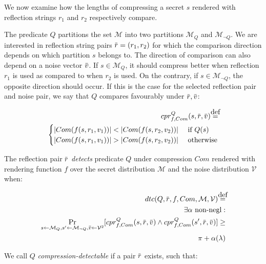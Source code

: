 \documentclass{sig-alternate-05-2015}
\newcommand\defeq{\stackrel{\mathclap{\normalfont\mbox{def}}}{=}}
\newcommand{\overbar}[1]{\mkern 1.5mu\overline{\mkern-1.5mu#1\mkern-1.5mu}\mkern 1.5mu}
\begin{document}
We now examine how the lengths of compressing a secret $s$ rendered with
reflection strings $r_1$ and $r_2$ respectively compare.

The predicate $Q$ partitions the set $\mathcal{M}$ into two partitions
$\mathcal{M}_Q$ and $\mathcal{M}_{\lnot Q}$. We are interested in reflection
string pairs $\overbar{r} = (r_1, r_2)$ for which the comparison direction
depends on which partition $s$ belongs to.  The direction of comparison can
also depend on a noise vector $\overbar{v}$.  If $s \in \mathcal{M}_Q$, it
should compress better when reflection $r_1$ is used as compared to when $r_2$
is used. On the contrary, if $s \in \mathcal{M}_{\lnot Q}$, the opposite
direction should occur.  If this is the case for the selected reflection pair
and noise pair, we say that $Q$ compares favourably under $\overbar{r},
\overbar{v}$:

\begin{equation*}
\begin{split}
    cpr^Q_{f, Com}(s, \overbar{r}, \overbar{v})
    \defeq\\
    \begin{cases}
        |Com(f(s, r_1, v_1))| < |Com(f(s, r_2, v_2))| &\text{ if } Q(s)\\
        |Com(f(s, r_1, v_1))| > |Com(f(s, r_2, v_2))| &\text{ otherwise}
    \end{cases}
\end{split}
\end{equation*}

The reflection pair $\overbar{r}$ \textit{detects} predicate $Q$ under
compression $Com$ rendered with rendering function $f$ over the secret
distribution $\mathcal{M}$ and the noise distribution $\mathcal{V}$ when:

\begin{align*}
    dtc(Q, \overbar{r}, f, Com, \mathcal{M}, \mathcal{V})
    \defeq\\
    \exists \alpha \text{ non-negl}:\\
    \Pr_{s \leftarrow \mathcal{M}_Q,
        s' \leftarrow \mathcal{M}_{\lnot Q},
        \overbar{v} \leftarrow \mathcal{V}^2}
        [cpr^Q_{f, Com}(s, \overbar{r}, \overbar{v}) \land
         cpr^Q_{f, Com}(s', \overbar{r}, \overbar{v})]
    \geq\\
    \pi + \alpha(\lambda)
\end{align*}

We call $Q$ \textit{compression-detectable} if a pair $\overbar{r}$ exists,
such that:
\end{document}
